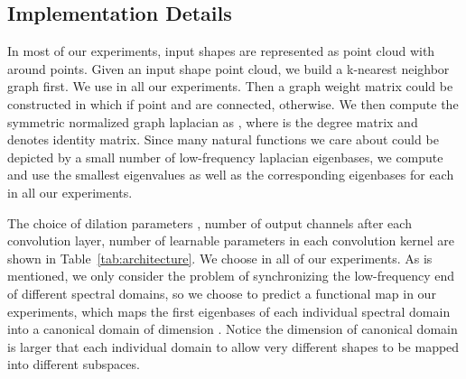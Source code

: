 \documentclass[10pt,twocolumn,letterpaper]{article}
\newcommand{\cmt}[2]{[#1: #2]}
\newcommand{\todo}[1]{\cmt{{\bf TODO}}{{\bf \color{blue} #1}}}
\begin{document}
\subsection{Implementation Details}
\label{sec:impl}
In most of our experiments, input shapes are represented as point cloud with around  points. Given an input shape point cloud, we build a k-nearest neighbor graph  first. We use  in all our experiments. Then a graph weight matrix  could be constructed in which  if point  and  are connected,  otherwise. We then compute the symmetric normalized graph laplacian  as , where  is the degree matrix and  denotes identity matrix. Since many natural functions we care about could be depicted by a small number of low-frequency laplacian eigenbases, we compute and use the smallest  eigenvalues as well as the corresponding eigenbases for each  in all our experiments. 

The choice of dilation parameters , number of output channels after each convolution layer, number of learnable parameters in each convolution kernel are shown in Table~\ref{tab:architecture}. We choose  in all of our experiments. As is mentioned, we only consider the problem of synchronizing the low-frequency end of different spectral domains, so we choose to predict a functional map  in our experiments, which maps the first  eigenbases of each individual spectral domain into a canonical domain of dimension . Notice the dimension of canonical domain is larger that each individual domain to allow very different shapes to be mapped into different subspaces.





\iffalse
\todo{
  \begin{itemize}
    \item how to build the shape graph; compute the normalized laplacian
  \end{itemize}
}
\fi 
\end{document}
